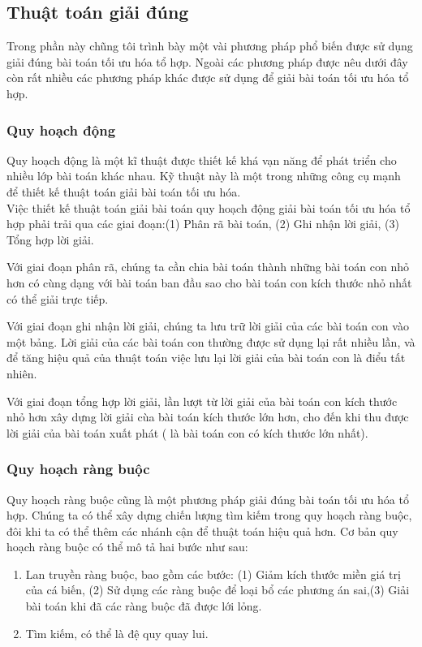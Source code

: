 \documentclass[a4paper,12pt]{report}
\begin{document}
\subsection{Thuật toán giải đúng}
Trong phần này chũng tôi trình bày một vài phương pháp phổ biến được sử dụng giải đúng bài toán tối ưu hóa tổ hợp. Ngoài các phương pháp được nêu dưới đây còn rất nhiều các phương pháp khác được sử dụng để giải bài toán tối ưu hóa tổ hợp.
\subsubsection{Quy hoạch động}
Quy hoạch động là một kĩ thuật được thiết kế khá vạn năng để phát triển cho nhiều lớp bài toán khác nhau. Kỹ thuật này là một trong những công cụ mạnh để thiết kế thuật toán giải bài toán tối ưu hóa. \cite{DAA} \\

Việc thiết kế thuật toán giải bài toán quy hoạch động giải bài toán tối ưu hóa tổ hợp phải trải qua các giai đoạn:(1) Phân rã bài toán, (2) Ghi nhận lời giải, (3) Tổng hợp lời giải. \cite{DAA}

Với giai đoạn phân rã, chúng ta cần chia bài toán thành những bài toán con nhỏ hơn có cùng dạng với bài toán ban đầu sao cho bài toán con kích thước nhỏ nhất có thể giải trực tiếp. \cite{DAA}

Với giai đoạn ghi nhận lời giải, chúng ta lưu trữ lời giải của các bài toán con vào một bảng. Lời giải của các bài toán con thường được sử dụng lại rất nhiều lần, và để tăng hiệu quả của thuật toán việc lưu lại lời giải của bài toán con là điểu tất nhiên.\cite{DAA}

Với giai đoạn tổng hợp lời giải, lần lượt từ lời giải của bài toán con kích thước nhỏ hơn xây dựng lời giải cùa bài toán kích thước lớn hơn, cho đến khi thu được lời giải của bài toán xuất phát ( là bài toán con có kích thước lớn nhất). \cite{DAA}
\subsubsection{Quy hoạch ràng buộc}
Quy hoạch ràng buộc cũng là một phương pháp giải đúng bài toán tối ưu hóa tổ hợp. Chúng ta có thể xây dựng chiến lượng tìm kiếm trong quy hoạch ràng buộc, đôi khi ta có thể thêm các nhánh cận để thuật toán hiệu quả hơn\cite{HCP}. Cơ bản quy hoạch ràng buộc có thể mô tả hai bước như sau:
\begin{enumerate}
\item Lan truyền ràng buộc, bao gồm các bước: (1) Giảm kích thước miền giá trị của cá biến, (2) Sử dụng các ràng buộc để loại bổ các phương án sai,(3) Giải bài toán khi đã các ràng buộc đã được lới lỏng.
\item Tìm kiếm, có thể là đệ quy quay lui.\cite{CBLS}
\end{enumerate}
\end{document}
